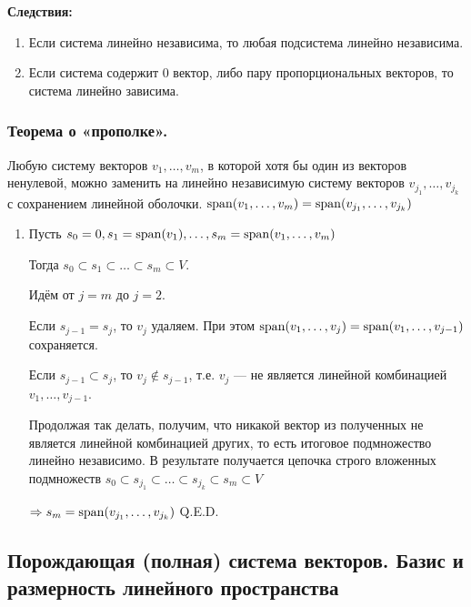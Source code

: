 \textbf{Следствия:}

\begin{enumerate}
    \item Если система линейно независима, то любая подсистема линейно независима.

    \item Если система содержит \(0\) вектор, либо пару пропорциональных векторов, то система линейно зависима.
\end{enumerate}



\subsubsection{Теорема о «прополке».}

Любую систему векторов \(v_1, \ldots, v_m\), в которой хотя бы один из векторов ненулевой, можно заменить на линейно независимую систему векторов \(v_{j_1}, \ldots, v_{j_k}\) с сохранением линейной оболочки. \(\operatorname{span} (v_1, \ldots, v_m) = \operatorname{span} (v_{j_1}, \ldots, v_{j_k})\)

\begin{enumerate}
    \item[] \prooff{}
          Пусть \(s_0 = 0, s_1 = \operatorname{span} (v_1), \ldots, s_m = \operatorname{span} (v_1, \ldots, v_m)\)

          Тогда \(s_0 \subset s_1 \subset \ldots \subset s_m \subset V\).

          Идём от \(j = m\) до \(j = 2\).

          Если \(s_{j - 1} = s_j\), то \(v_j\) удаляем. При этом \(\operatorname{span} (v_1, \ldots, v_j) = \operatorname{span} (v_1, \ldots, v_{j - 1})\) сохраняется.

          Если \(s_{j - 1} \subset s_j\), то \(v_j \notin s_{j - 1}\), т.е. \(v_j\) --- не является линейной комбинацией \(v_1, \ldots, v_{j - 1}\).

          Продолжая так делать, получим, что никакой вектор из полученных не является линейной комбинацией других, то есть итоговое подмножество линейно независимо. В результате получается цепочка строго вложенных подмножеств \(s_0 \subset s_{j_1} \subset \ldots \subset s_{j_k} \subset s_m \subset V \)

          \(\Rightarrow s_m = \operatorname{span} (v_{j_1}, \ldots, v_{j_k})\) \hfill Q.E.D.
\end{enumerate}

\subsection{Порождающая (полная) система векторов. Базис и размерность линейного пространства}

